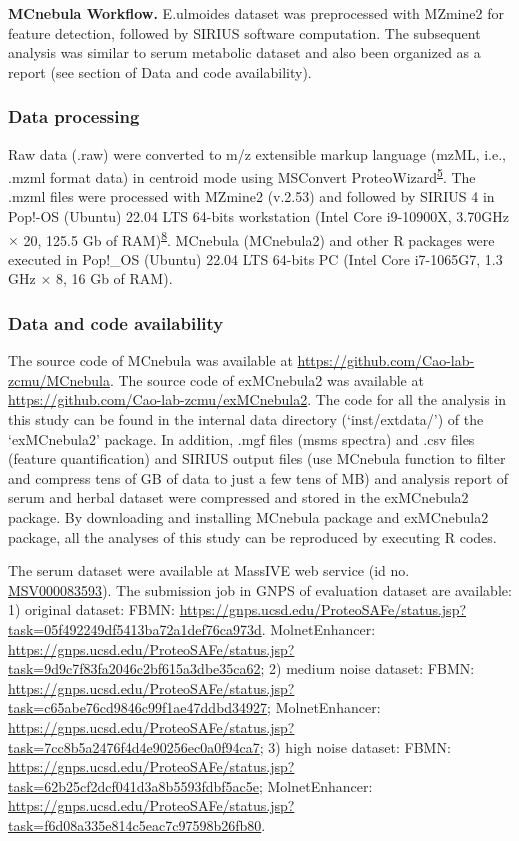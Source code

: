 \documentclass[
]{article}
\begin{document}
\textbf{MCnebula Workflow.} E.ulmoides dataset was preprocessed with
MZmine2 for feature detection, followed by SIRIUS software computation.
The subsequent analysis was similar to serum metabolic dataset and also
been organized as a report (see section of Data and code availability).

\hypertarget{data-processing}{%
\subsubsection{Data processing}\label{data-processing}}

Raw data (.raw) were converted to m/z extensible markup language (mzML,
i.e., .mzml format data) in centroid mode using MSConvert
ProteoWizard\textsuperscript{\protect\hyperlink{ref-2012d}{5}}. The
.mzml files were processed with MZmine2 (v.2.53) and followed by SIRIUS
4 in Pop!-OS (Ubuntu) 22.04 LTS 64-bits workstation (Intel Core
i9-10900X, 3.70GHz \(\times\) 20, 125.5 Gb of
RAM)\textsuperscript{\protect\hyperlink{ref-2010}{8}}. MCnebula
(MCnebula2) and other R packages were executed in Pop!\_OS (Ubuntu)
22.04 LTS 64-bits PC (Intel Core i7-1065G7, 1.3 GHz \(\times\) 8, 16 Gb
of RAM).

\hypertarget{data-and-code-availability}{%
\subsubsection{Data and code
availability}\label{data-and-code-availability}}

The source code of MCnebula was available at
\url{https://github.com/Cao-lab-zcmu/MCnebula}. The source code of
exMCnebula2 was available at
\url{https://github.com/Cao-lab-zcmu/exMCnebula2}. The code for all the
analysis in this study can be found in the internal data directory
(`inst/extdata/') of the `exMCnebula2' package. In addition, .mgf files
(msms spectra) and .csv files (feature quantification) and SIRIUS output
files (use MCnebula function to filter and compress tens of GB of data
to just a few tens of MB) and analysis report of serum and herbal
dataset were compressed and stored in the exMCnebula2 package. By
downloading and installing MCnebula package and exMCnebula2 package, all
the analyses of this study can be reproduced by executing R codes.

The serum dataset were available at MassIVE web service (id no.
\href{https://massive.ucsd.edu/ProteoSAFe/QueryMSV?id=MSV000079949}{MSV000083593}).
The submission job in GNPS of evaluation dataset are available: 1)
original dataset: FBMN:
\url{https://gnps.ucsd.edu/ProteoSAFe/status.jsp?task=05f492249df5413ba72a1def76ca973d}.
MolnetEnhancer:
\url{https://gnps.ucsd.edu/ProteoSAFe/status.jsp?task=9d9c7f83fa2046c2bf615a3dbe35ca62};
2) medium noise dataset: FBMN:
\url{https://gnps.ucsd.edu/ProteoSAFe/status.jsp?task=c65abe76cd9846c99f1ae47ddbd34927};
MolnetEnhancer:
\url{https://gnps.ucsd.edu/ProteoSAFe/status.jsp?task=7cc8b5a2476f4d4e90256ec0a0f94ca7};
3) high noise dataset: FBMN:
\url{https://gnps.ucsd.edu/ProteoSAFe/status.jsp?task=62b25cf2dcf041d3a8b5593fdbf5ac5e};
MolnetEnhancer:
\url{https://gnps.ucsd.edu/ProteoSAFe/status.jsp?task=f6d08a335e814c5eac7c97598b26fb80}.
\end{document}
